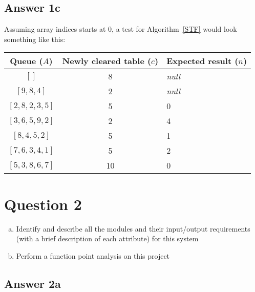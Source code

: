 \documentclass[
  11pt, %
]{assignment}
\begin{document}
\subsection*{Answer 1c}

Assuming array indices starts at 0, a test for Algorithm~\ref{STF} would look something like this:

\medskip

\centering
\begin{tabular}{c c | l}
  Queue (\(A\))       & Newly cleared table (\(c\)) & \textbf{Expected result (\(n\))} \\
  \toprule
  \([]\)              & 8                           & \textit{null}                    \\
  \([9, 8, 4]\)       & 2                           & \textit{null}                    \\
  \([2, 8, 2, 3, 5]\) & 5                           & 0                                \\
  \([3, 6, 5, 9, 2]\) & 2                           & 4                                \\
  \([8, 4, 5, 2]\)    & 5                           & 1                                \\
  \([7, 6, 3, 4, 1]\) & 5                           & 2                                \\
  \([5, 3, 8, 6, 7]\) & 10                          & 0                                \\
  \bottomrule
\end{tabular}

\pagebreak

\section*{Question 2}

\begin{problem}
\begin{enumerate}[a.]
  \item Identify and describe all the modules and their input/output requirements (with a brief description of each attribute) for this system
  \item Perform a function point analysis on this project
\end{enumerate}
\end{problem}

\subsection*{Answer 2a}
\end{document}
